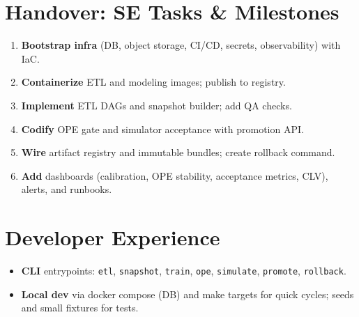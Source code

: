 \section{Handover: SE Tasks \& Milestones}
\begin{enumerate}
  \item \textbf{Bootstrap infra} (DB, object storage, CI/CD, secrets, observability) with IaC.
  \item \textbf{Containerize} ETL and modeling images; publish to registry.
  \item \textbf{Implement} ETL DAGs and snapshot builder; add QA checks.
  \item \textbf{Codify} OPE gate and simulator acceptance with promotion API.
  \item \textbf{Wire} artifact registry and immutable bundles; create rollback command.
  \item \textbf{Add} dashboards (calibration, OPE stability, acceptance metrics, CLV), alerts, and runbooks.
\end{enumerate}

\section{Developer Experience}
\begin{itemize}
  \item \textbf{CLI} entrypoints: \texttt{etl}, \texttt{snapshot}, \texttt{train}, \texttt{ope}, \texttt{simulate}, \texttt{promote}, \texttt{rollback}.
  \item \textbf{Local dev} via docker compose (DB) and make targets for quick cycles; seeds and small fixtures for tests.
\end{itemize}
